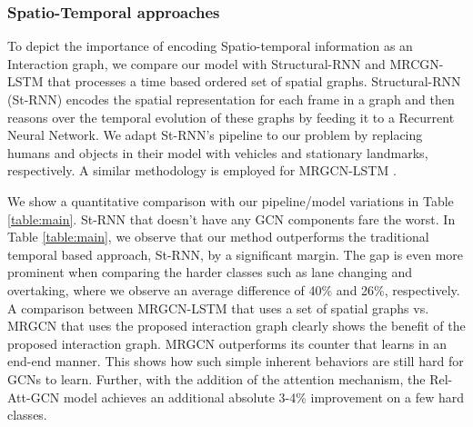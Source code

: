 \documentclass[letterpaper, 10 pt, conference]{ieeeconf}
\begin{document}
\subsubsection{Spatio-Temporal approaches}
To depict the importance of encoding Spatio-temporal information as an Interaction graph, we compare our model with Structural-RNN \cite{jain2016structural} and MRCGN-LSTM \cite{mylavarapu2020accurate} that processes a time based ordered set of spatial graphs. Structural-RNN (St-RNN) encodes the spatial representation for each frame in a graph and then reasons over the temporal evolution of these graphs by feeding it to a Recurrent Neural Network. We adapt St-RNN's pipeline to our problem by replacing humans and objects in their model with vehicles and stationary landmarks, respectively. A similar methodology is employed for MRGCN-LSTM \cite{mylavarapu2020accurate}.

We show a quantitative comparison with our pipeline/model variations in Table \ref{table:main}. St-RNN that doesn't have any GCN components fare the worst. In Table \ref{table:main}, we observe that our method outperforms the traditional temporal based approach, St-RNN, by a significant margin. The gap is even more prominent when comparing the harder classes such as lane changing and overtaking, where we observe an average difference of 40\% and 26\%, respectively. A comparison between MRGCN-LSTM that uses a set of spatial graphs vs. MRGCN that uses the proposed interaction graph clearly shows the benefit of the proposed interaction graph. MRGCN outperforms its counter that learns in an end-end manner. This shows how such simple inherent behaviors are still hard for GCNs to learn. Further, with the addition of the attention mechanism, the Rel-Att-GCN model achieves an additional absolute 3-4\% improvement on a few hard classes.
\end{document}
